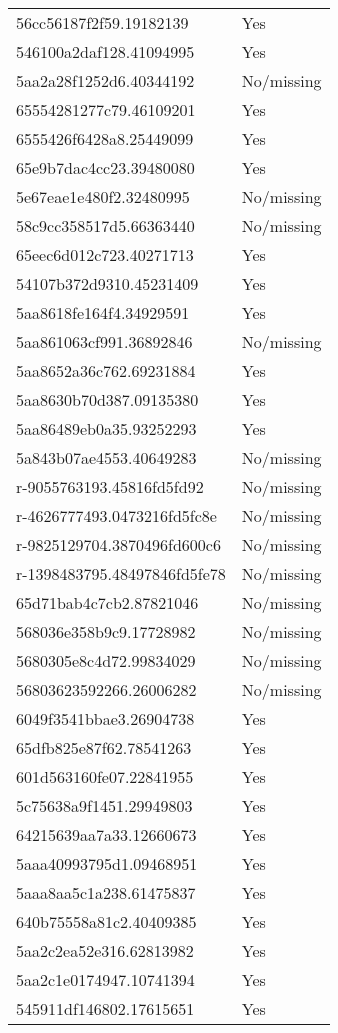 \begin{tabular}{ll}
56cc56187f2f59.19182139 & Yes \\
546100a2daf128.41094995 & Yes \\
5aa2a28f1252d6.40344192 & No/missing \\
65554281277c79.46109201 & Yes \\
6555426f6428a8.25449099 & Yes \\
65e9b7dac4cc23.39480080 & Yes \\
5e67eae1e480f2.32480995 & No/missing \\
58c9cc358517d5.66363440 & No/missing \\
65eec6d012c723.40271713 & Yes \\
54107b372d9310.45231409 & Yes \\
5aa8618fe164f4.34929591 & Yes \\
5aa861063cf991.36892846 & No/missing \\
5aa8652a36c762.69231884 & Yes \\
5aa8630b70d387.09135380 & Yes \\
5aa86489eb0a35.93252293 & Yes \\
5a843b07ae4553.40649283 & No/missing \\
r-9055763193.45816fd5fd92 & No/missing \\
r-4626777493.0473216fd5fc8e & No/missing \\
r-9825129704.3870496fd600c6 & No/missing \\
r-1398483795.48497846fd5fe78 & No/missing \\
65d71bab4c7cb2.87821046 & No/missing \\
568036e358b9c9.17728982 & No/missing \\
5680305e8c4d72.99834029 & No/missing \\
56803623592266.26006282 & No/missing \\
6049f3541bbae3.26904738 & Yes \\
65dfb825e87f62.78541263 & Yes \\
601d563160fe07.22841955 & Yes \\
5c75638a9f1451.29949803 & Yes \\
64215639aa7a33.12660673 & Yes \\
5aaa40993795d1.09468951 & Yes \\
5aaa8aa5c1a238.61475837 & Yes \\
640b75558a81c2.40409385 & Yes \\
5aa2c2ea52e316.62813982 & Yes \\
5aa2c1e0174947.10741394 & Yes \\
545911df146802.17615651 & Yes \\

\end{tabular}
